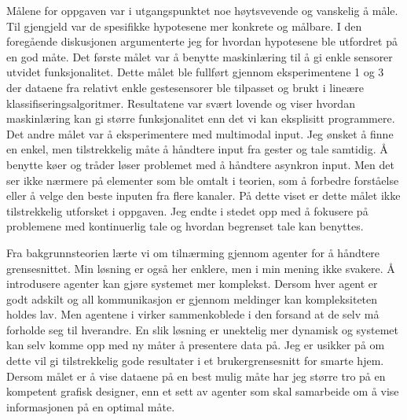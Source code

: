 Målene for oppgaven var i utgangspunktet noe høytsvevende og vanskelig å måle. Til gjengjeld var de spesifikke hypotesene mer konkrete og målbare. I den foregående diskusjonen argumenterte jeg for hvordan hypotesene ble utfordret på en god måte. Det første målet var å benytte maskinlæring til å gi enkle sensorer utvidet funksjonalitet. Dette målet ble fullført gjennom eksperimentene 1 og 3 der dataene fra relativt enkle gestesensorer ble tilpasset og brukt i lineære klassifiseringsalgoritmer. Resultatene var svært lovende og viser hvordan maskinlæring kan gi større funksjonalitet enn det vi kan eksplisitt programmere. Det andre målet var å eksperimentere med multimodal input. Jeg ønsket å finne en enkel, men tilstrekkelig måte å håndtere input fra gester og tale samtidig. Å benytte køer og tråder løser problemet med å håndtere asynkron input. Men det ser ikke nærmere på elementer som ble omtalt i teorien, som å forbedre forståelse eller å velge den beste inputen fra flere kanaler. På dette viset er dette målet ikke tilstrekkelig utforsket i oppgaven. Jeg endte i stedet opp med å fokusere på problemene med kontinuerlig tale og hvordan begrenset tale kan benyttes.

Fra bakgrunnsteorien lærte vi om tilnærming gjennom agenter for å håndtere grensesnittet. Min løsning er også her enklere, men i min mening ikke svakere. Å introdusere agenter kan gjøre systemet mer komplekst. Dersom hver agent er godt adskilt og all kommunikasjon er gjennom meldinger kan kompleksiteten holdes lav. Men agentene i \citet{ishizaki96} virker sammenkoblede i den forsand at de selv må forholde seg til hverandre. En slik løsning er unektelig mer dynamisk og systemet kan selv komme opp med ny måter å presentere data på. Jeg er usikker på om dette vil gi tilstrekkelig gode resultater i et brukergrensesnitt for smarte hjem. Dersom målet er å vise dataene på en best mulig måte har jeg større tro på en kompetent grafisk designer, enn et sett av agenter som skal samarbeide om å vise informasjonen på en optimal måte. 


